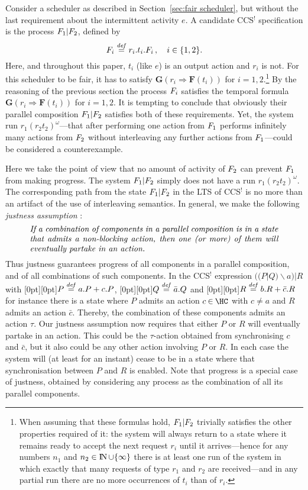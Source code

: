 \documentclass[smallcondensed]{svjour3}
\newcommand{\plat}[1]{\raisebox{0pt}[0pt][0pt]{#1}}  \def\precond#1{{\vphantom{#1}}^\bullet #1}
\newcommand{\Sect}[1]{Section~\ref{sec:#1}}
\renewcommand{\inf}{^{\omega}}
\newcounter {part}
\begin{document}
Consider a scheduler as described in \Sect{fair scheduler}, but without the last requirement about
the intermittent activity $e$.  A candidate CCS$^!$ specification is the process $F_1 | F_2$, defined by\vspace{-2ex}
\[ F_i \stackrel{{\it def}}{=} r_i.t_i.F_i\,,\quad i\in\{1,2\}.\]
Here, and throughout this paper, $t_i$ (like $e$) is an output action and $r_i$ is not.
For this scheduler to be fair, it has to satisfy
$\mathbf{G}(r_i \Rightarrow \mathbf{F}(t_i))$ for $i\mathbin=1,2$.\footnote{When assuming that these formulas hold,
  $F_1|F_2$ trivially satisfies the other properties required of it:
  the system will always return to a state where it remains ready to
  accept the next request $r_i$ until it arrives---hence for any numbers $n_1$ and
  $n_2\in\mathop{\rm I\mkern-2.5mu N}\nolimits \cup\{\infty\}$ there is at least one run of the system in which exactly that many
  requests of type $r_1$ and $r_2$ are received---and in any partial run there are no more
  occurrences of $t_i$ than of $r_i$.}
By the reasoning of the previous section the process
$F_i$ satisfies the temporal formula $\mathbf{G}(r_i \Rightarrow \mathbf{F}(t_i))$ for $i\mathbin=1,2$.
It is tempting to conclude that obviously their parallel composition $F_{1} | F_{2}$ satisfies both of
these requirements. Yet, the system run $r_1(r_2 t_2)\inf$\linebreak[1]---that after performing one action
from $F_1$ performs infinitely many actions from $F_2$ without interleaving any further actions from
$F_1$---could be considered a counterexample.

Here we take the point of view that no amount of activity of $F_2$ can prevent $F_1$ from making
progress. The system $F_1|F_2$ simply does not have a run $r_1(r_2 t_2)\inf\!$.
The corresponding path from the state $F_1|F_2$ in the LTS of CCS$^!$ is no
more than an artifact of the use of interleaving semantics. In general, we make the following
\emph{justness assumption} \cite{GH14}: 
\[
\parbox{0.87\textwidth}{\textit{If a combination of components in a parallel composition is in a state
    that admits a non-blocking action, then one (or more) of them  will eventually partake in an action.
    }}
\]
Thus justness guarantees progress of all components in a parallel composition, and of all
combinations of such components.\vspace{2pt} In the CCS$^!$ expression $((P|Q)\backslash a) | R$ 
with  
\plat{$P \stackrel{{\it def}}{=} a.P + c.P$}, 
\plat{$Q \stackrel{{\it def}}{=} \bar a.Q$} and 
\plat{$R \stackrel{{\it def}}{=} b.R + \bar c.R$}
 for
instance
there is a state where $P$ admits an action $c\mathbin\in\HC$ with $c\neq a$ and $R$ admits an action
$\bar c$. Thereby, the combination of these components admits an action $\tau$. Our justness
assumption now requires that either $P$ or $R$ will eventually
partake in an action.
This could be the $\tau$-action obtained from synchronising $c$ and $\bar c$, but it also could be
any other action involving $P$ or $R$. In each case the system will (at least for an instant) cease to be in a state where that
synchronisation between $P$ and $R$ is enabled.
Note that progress is a special case of justness, obtained by considering any process as the
combination of all its parallel components.
\end{document}
